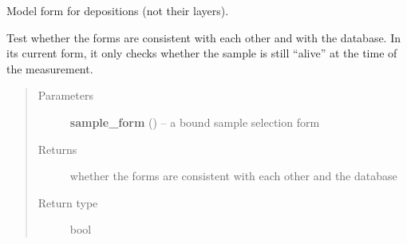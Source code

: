\documentclass[a4paper,11pt,english]{sphinxmanual}
\begin{document}
\begin{fulllineitems}
\label{programming/utilities:samples.utils.views.DepositionForm}
Model form for depositions (not their layers).

\begin{fulllineitems}
\label{programming/utilities:samples.utils.views.DepositionForm.is_referentially_valid}
Test whether the forms are consistent with each other and with the database.
In its current form, it only checks whether the sample is still “alive”
at the time of the measurement.
\begin{quote}\begin{description}
\item[{Parameters}] \leavevmode
\textbf{sample\_form} () -- a bound sample selection form

\item[{Returns}] \leavevmode
whether the forms are consistent with each other and the database

\item[{Return type}] \leavevmode
bool

\end{description}\end{quote}

\end{fulllineitems}


\end{fulllineitems}

\end{document}
